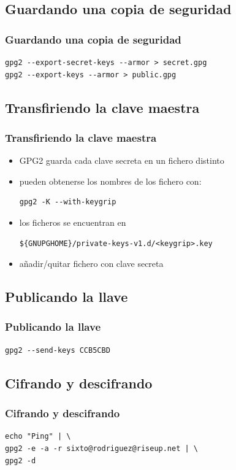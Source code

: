 \documentclass{beamer}
\let\olditem\item
\renewcommand{\item}{%
\olditem\vspace{3pt}}
\begin{document}
\subsection{Guardando una copia de seguridad}
\begin{frame}[fragile]
\frametitle{Guardando una copia de seguridad}
\begin{lstlisting}
gpg2 --export-secret-keys --armor > secret.gpg
gpg2 --export-keys --armor > public.gpg
\end{lstlisting}
\end{frame}


\subsection{Transfiriendo la clave maestra}
\begin{frame}[fragile]
\frametitle{Transfiriendo la clave maestra}
\begin{itemize}
    \item GPG2 guarda cada clave secreta en un fichero distinto
    \item pueden obtenerse los nombres de los fichero con:
\begin{lstlisting}
gpg2 -K --with-keygrip
\end{lstlisting}
    \item los ficheros se encuentran en
\begin{lstlisting}
${GNUPGHOME}/private-keys-v1.d/<keygrip>.key
\end{lstlisting}
    \item añadir/quitar fichero con clave secreta
\end{itemize}
\end{frame}


\subsection{Publicando la llave}
\begin{frame}[fragile]
\frametitle{Publicando la llave}
\begin{lstlisting}
gpg2 --send-keys CCB5CBD
\end{lstlisting}
\end{frame}


\subsection{Cifrando y descifrando}
\begin{frame}[fragile]
\frametitle{Cifrando y descifrando}
\begin{lstlisting}
echo "Ping" | \
gpg2 -e -a -r sixto@rodriguez@riseup.net | \
gpg2 -d
\end{lstlisting}
\end{frame}
\end{document}
